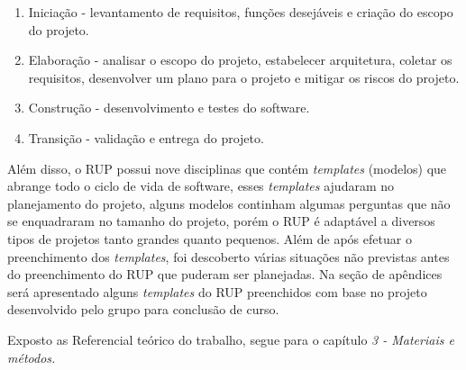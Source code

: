 \begin{enumerate}
	\item Iniciação - levantamento de requisitos, funções desejáveis e criação do escopo do projeto.
	\item Elaboração -  analisar o escopo do projeto, estabelecer arquitetura, coletar os requisitos, desenvolver um plano para o projeto e mitigar os riscos do projeto.
	\item Construção - desenvolvimento e testes do software.
	\item Transição - validação e entrega do projeto.
\end{enumerate}

Além disso, o RUP possui nove disciplinas que contém \textit{templates} (modelos) que abrange todo o ciclo de vida de software, esses \textit{templates} ajudaram no planejamento do projeto, alguns modelos continham algumas perguntas que não se enquadraram no tamanho do projeto, porém o RUP é adaptável a diversos tipos de projetos tanto grandes quanto pequenos.  Além de após efetuar o preenchimento dos \textit{templates}, foi descoberto várias situações não previstas antes do preenchimento do RUP que puderam ser planejadas. Na seção de apêndices será apresentado alguns \textit{templates} do RUP preenchidos com base no projeto desenvolvido pelo grupo para conclusão de curso. 

Exposto as Referencial teórico do trabalho, segue para o capítulo \textit{3 - Materiais e métodos.}